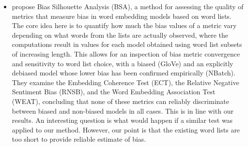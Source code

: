 \documentclass{clv3}
\begin{document}
\begin{itemize}
\item \citet{Spliethover2021BiasSilhouette} propose Bias Silhouette Analysis (BSA), a method for assessing the quality of metrics that measure bias in word embedding models based on word lists. The core idea here is to quantify how much the bias values of a metric vary depending on what words from the lists are actually observed, where the computations result in  values for each model obtained  using word list subsets of increasing length. This allows for an inspection of bias metric convergence and sensitivity to word list choice, with a biased (GloVe) and an explicitly debiased model whose lower bias has been confirmed empirically (NBatch).  They examine the Embedding Coherence Test (ECT), the Relative Negative Sentiment Bias (RNSB), and the Word Embedding Association Test (WEAT), concluding  that none of these metrics can reliably discriminate between biased and non-biased models in all cases. This is in line with our results. An interesting question is what would happen if a similar test was applied to our method. However, our point is that the existing word lists are too short to provide reliable estimate of bias.


\end{itemize}



\vspace{2mm}
\end{document}

